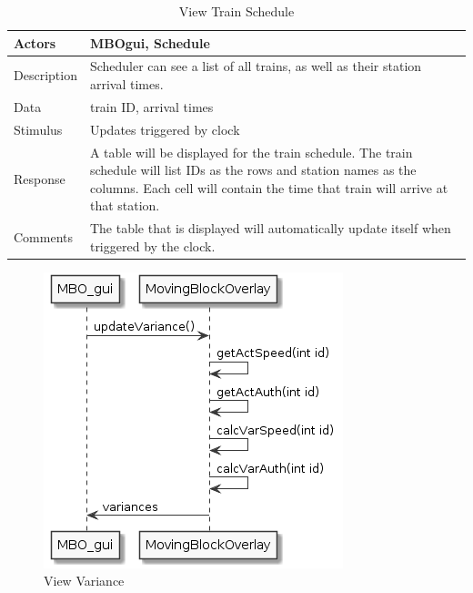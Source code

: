 \documentclass[]{article}
\begin{document}
	\begin{table}[H]
		\centering
		\caption{View Train Schedule}
		\begin{tabular}{|l|l|}
			\hline
			Actors & \parbox[t]{10cm}{MBOgui, Schedule} \\ \hline
			Description & \parbox[t]{10cm}{Scheduler can see a list of all  trains, as well as their station arrival times.} \\ \hline
			Data &  \parbox[t]{10cm}{train ID, arrival times} \\ \hline
			Stimulus &  \parbox[t]{10cm}{Updates triggered by clock} \\ \hline
			Response & \parbox[t]{10cm}{A table will be displayed for the train schedule. The train schedule will list IDs as the rows and station names as the columns. Each cell will contain the time that train will arrive at that station.}\\ \hline
			Comments & \parbox[t]{10cm}{The table that is displayed will automatically update itself when triggered by the clock.}  \\ \hline
		\end{tabular}
	\end{table}
	
	\begin{figure}[H]
		\centering
		\includegraphics{viewVariance.png}
		\caption{View Variance}
	\end{figure}
	
\end{document}
